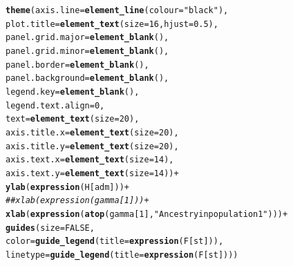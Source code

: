 \documentclass{article}\usepackage[]{graphicx}\usepackage[]{color}
\makeatletter
\newcommand{\hlnum}[1]{\textcolor[rgb]{0.686,0.059,0.569}{#1}}%
\newcommand{\hlstr}[1]{\textcolor[rgb]{0.192,0.494,0.8}{#1}}%
\newcommand{\hlcom}[1]{\textcolor[rgb]{0.678,0.584,0.686}{\textit{#1}}}%
\newcommand{\hlopt}[1]{\textcolor[rgb]{0,0,0}{#1}}%
\newcommand{\hlstd}[1]{\textcolor[rgb]{0.345,0.345,0.345}{#1}}%
\newcommand{\hlkwc}[1]{\textcolor[rgb]{0.333,0.667,0.333}{#1}}%
\newcommand{\hlkwd}[1]{\textcolor[rgb]{0.737,0.353,0.396}{\textbf{#1}}}%
\newenvironment{kframe}{%
 \def\at@end@of@kframe{}%
 \ifinner\ifhmode%
  \def\at@end@of@kframe{\end{minipage}}%
  \begin{minipage}{\columnwidth}%
 \fi\fi%
 \def\FrameCommand##1{\hskip\@totalleftmargin \hskip-\fboxsep
 \colorbox{shadecolor}{##1}\hskip-\fboxsep
     \hskip-\linewidth \hskip-\@totalleftmargin \hskip\columnwidth}%
 \MakeFramed {\advance\hsize-\width
   \@totalleftmargin\z@ \linewidth\hsize
   \@setminipage}}%
 {\par\unskip\endMakeFramed%
 \at@end@of@kframe}
\newenvironment{knitrout}{}{} %
\makeatother
\begin{document}
\begin{knitrout}
\begin{kframe}
\begin{alltt}
  \hlkwd{theme}\hlstd{(}\hlkwc{axis.line} \hlstd{=} \hlkwd{element_line}\hlstd{(}\hlkwc{colour} \hlstd{=} \hlstr{"black"}\hlstd{),}
        \hlkwc{plot.title} \hlstd{=} \hlkwd{element_text}\hlstd{(}\hlkwc{size} \hlstd{=} \hlnum{16}\hlstd{,} \hlkwc{hjust} \hlstd{=} \hlnum{0.5}\hlstd{),}
        \hlkwc{panel.grid.major} \hlstd{=} \hlkwd{element_blank}\hlstd{(),}
        \hlkwc{panel.grid.minor} \hlstd{=} \hlkwd{element_blank}\hlstd{(),}
        \hlkwc{panel.border} \hlstd{=} \hlkwd{element_blank}\hlstd{(),}
        \hlkwc{panel.background} \hlstd{=} \hlkwd{element_blank}\hlstd{(),}
        \hlkwc{legend.key} \hlstd{=} \hlkwd{element_blank}\hlstd{(),}
        \hlkwc{legend.text.align} \hlstd{=} \hlnum{0}\hlstd{,}
        \hlkwc{text} \hlstd{=} \hlkwd{element_text}\hlstd{(}\hlkwc{size}\hlstd{=}\hlnum{20}\hlstd{),}
        \hlkwc{axis.title.x} \hlstd{=} \hlkwd{element_text}\hlstd{(}\hlkwc{size}\hlstd{=}\hlnum{20}\hlstd{),}
        \hlkwc{axis.title.y} \hlstd{=} \hlkwd{element_text}\hlstd{(}\hlkwc{size}\hlstd{=}\hlnum{20}\hlstd{),}
        \hlkwc{axis.text.x} \hlstd{=} \hlkwd{element_text}\hlstd{(}\hlkwc{size}\hlstd{=}\hlnum{14}\hlstd{),}
        \hlkwc{axis.text.y} \hlstd{=} \hlkwd{element_text}\hlstd{(}\hlkwc{size}\hlstd{=}\hlnum{14}\hlstd{))} \hlopt{+}
  \hlkwd{ylab}\hlstd{(}\hlkwd{expression}\hlstd{(H[adm]))} \hlopt{+}
  \hlcom{##xlab(expression(gamma[1])) +}
  \hlkwd{xlab}\hlstd{(}\hlkwd{expression}\hlstd{(}\hlkwd{atop}\hlstd{(gamma[}\hlnum{1}\hlstd{],} \hlstr{"Ancestry in population 1"}\hlstd{)))} \hlopt{+}
  \hlkwd{guides}\hlstd{(}\hlkwc{size}\hlstd{=}\hlnum{FALSE}\hlstd{,}
         \hlkwc{color}\hlstd{=}\hlkwd{guide_legend}\hlstd{(}\hlkwc{title}\hlstd{=}\hlkwd{expression}\hlstd{(F[st])),}
         \hlkwc{linetype}\hlstd{=}\hlkwd{guide_legend}\hlstd{(}\hlkwc{title}\hlstd{=}\hlkwd{expression}\hlstd{(F[st])))}
\end{alltt}



\end{kframe}
\end{knitrout}
\end{document}

